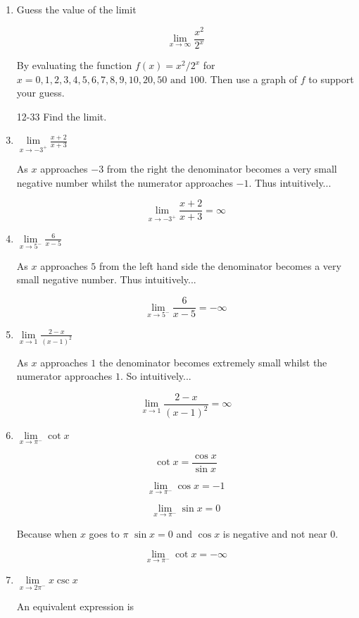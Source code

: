 \documentclass{article}
\begin{document}
\begin{enumerate}
		\item Guess the value of the limit

			$$\lim \limits _{x \to \infty} \frac{x^2}{2^x}$$

		By evaluating the function $f(x) = x^2/2^x$ for $x = 0,1,2,3,4,5,6,7,8,9,10,20,50 \text{ and } 100$.
		Then use a graph of $f$ to support your guess.

		\item[12-33] Find the limit.

		\item $\lim \limits _{x \to -3^{+}} \frac{x+2}{x+3}$

			As $x$ approaches $-3$ from the right the denominator becomes
			a very small negative number whilst the numerator approaches
			$-1$. Thus intuitively...

			$$\lim \limits _{x \to -3^{+}} \frac{x+2}{x+3} = \infty$$

		\item $\lim \limits _{x \to 5^{-}} \frac{6}{x-5}$

			As $x$ approaches $5$ from the left hand side the denominator
			becomes a very small negative number. Thus intuitively...

			$$\lim \limits _{x \to 5^{-}} \frac{6}{x-5} = -\infty$$

		\item $\lim \limits _{x \to 1} \frac{2-x}{(x-1)^2}$

			As $x$ approaches $1$ the denominator becomes extremely
			small whilst the numerator approaches $1$. So intuitively...

			$$\lim \limits _{x \to 1} \frac{2-x}{(x-1)^2} = \infty$$

		\item $\lim \limits _{x \to \pi^{-}} \cot x$

			$$\cot x = \frac{\cos x}{\sin x}$$

			$$\lim \limits _{x \to \pi^{-}} \cos x = -1$$

			$$\lim \limits _{x \to \pi^{-}} \sin x = 0$$

			Because when $x$ goes to $\pi$ $\sin x = 0$ and $\cos x$ is
			negative and not near 0.

			$$\lim \limits _{x \to \pi^{-}} \cot x = -\infty$$

		\item $\lim \limits _{x \to 2\pi^{-}} x \csc x$

			An equivalent expression is


\end{enumerate}
\end{document}
